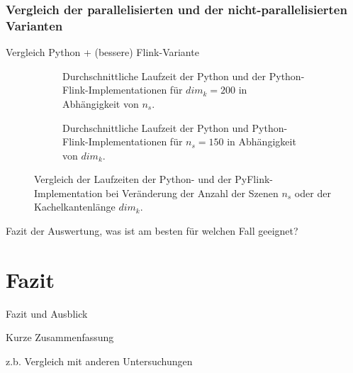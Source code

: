 \subsection{Vergleich der parallelisierten und der nicht-parallelisierten Varianten}
Vergleich Python + (bessere) Flink-Variante

\begin{figure}
\captionsetup[subfigure]{justification=centering}
\centering
	\begin{subfigure}{.45\textwidth}
		\centering
		\caption{Durchschnittliche Laufzeit der Python und der Python-Flink-Implementationen für $dim_k = 200$ in Abhängigkeit von $n_s$.}
  		\label{fig:diagrammPythonFlinkNS}
	\end{subfigure}\hfill
	\begin{subfigure}{.45\textwidth}
  		\centering
		\caption{Durchschnittliche Laufzeit der Python und Python-Flink-Implementationen für $n_s = 150$ in Abhängigkeit von $dim_k$.}
  		\label{fig:diagrammPythonFlinkDimK}
	\end{subfigure}
\caption{Vergleich der Laufzeiten der Python- und der PyFlink-Implementation bei Veränderung der Anzahl der Szenen $n_s$ oder der Kachelkantenlänge $dim_k$.}
\label{fig:diagrammsPythonFlink}
\end{figure}

Fazit der Auswertung, was ist am besten für welchen Fall geeignet?

\chapter{Fazit}
Fazit und Ausblick

Kurze Zusammenfassung

z.b. Vergleich mit anderen Untersuchungen

